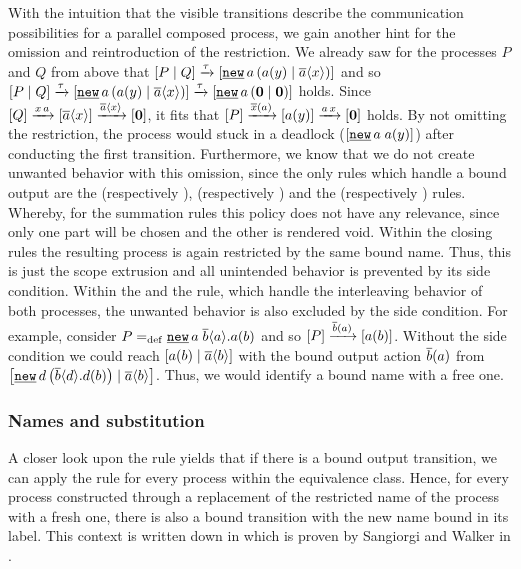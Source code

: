 With the intuition that the visible transitions describe the communication possibilities for a parallel composed process, we gain another hint for the omission and reintroduction of the restriction. We already saw for the processes $P$ and $Q$ from above that $\ec{\procpar{P}{Q}}\tautrans\ec{\procres[()]{a}{\procpar{\inp{a}{y}}{\out{a}{x}}}}$ and so $\ec{\procpar{P}{Q}}\tautrans\ec{\procres[()]{a}{\procpar{\inp{a}{y}}{\out{a}{x}}}}\tautrans\ec{\procres[()]{a}{\procpar{\proczero}{\proczero}}}$ holds. Since $\left[Q\right]\xrightarrow{x\,a}\left[\overline{a}\langle x\rangle\right]\xrightarrow{\overline{a}\langle x\rangle}\left[\mathbf{0}\right]$, it fits that $\left[P\right]\xrightarrow{\overline{x}(a)}\left[a(y)\right]\xrightarrow{a\,x}\left[\mathbf{0}\right]$ holds. By not omitting the restriction, the process would stuck in a deadlock ($\ec{\procres[]{a}{\inp{a}{y}}}$) after conducting the first transition. Furthermore, we know that we do not create unwanted behavior with this omission, since the only rules which handle a bound output are the \esuml{} (respectively \esumr{}), \eclosel{} (respectively \ecloser{}) and the \eparl{} (respectively \eparr{}) rules. Whereby, for the summation rules this policy does not have any relevance, since only one part will be chosen and the other is rendered void. Within the closing rules the resulting process is again restricted by the same bound name. Thus, this is just the scope extrusion and all unintended behavior is prevented by its side condition. Within the \eparl{} and the \eparr{} rule, which handle the interleaving behavior of both processes, the unwanted behavior is also excluded by the side condition. For example, consider $P\define\procres{a}{\out{b}{a}.\inp{a}{b}}$ and so $\left[P\right]\xrightarrow{\overline{b}(a)}\left[a(b)\right]$. Without the side condition we could reach $\left[a(b) \mid \overline{a}\langle b\rangle\right]$ with the bound output action $\overline{b}(a)$ from $\ec{\procpar{\procres[()]{d}{\out{b}{d}.\inp{d}{b}}}{\out{a}{b}}}$. Thus, we would identify a bound name with a free one.

\subsubsection{Names and substitution}
A closer look upon the \eopen{} rule yields that if there is a bound output transition, we can apply the \eopen{} rule for every process within the equivalence class. Hence, for every process constructed through a replacement of the restricted name of the process with a fresh one, there is also a bound transition with the new name bound in its label. This context is written down in  which is proven by Sangiorgi and Walker in \cite{sangiorgi}.

